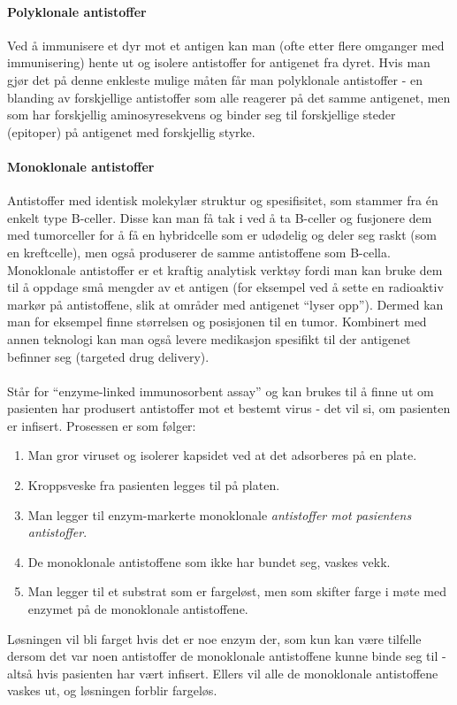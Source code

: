 \paragraph{Polyklonale antistoffer} Ved å immunisere et dyr mot et antigen kan man (ofte etter flere omganger med immunisering) hente ut og isolere antistoffer for antigenet fra dyret. Hvis man gjør det på denne enkleste mulige måten får man polyklonale antistoffer - en blanding av forskjellige antistoffer som alle reagerer på det samme antigenet, men som har forskjellig aminosyresekvens og binder seg til forskjellige steder (epitoper) på antigenet med forskjellig styrke.

\paragraph{Monoklonale antistoffer} Antistoffer med identisk molekylær struktur og spesifisitet, som stammer fra én enkelt type B-celler. Disse kan man få tak i ved å ta B-celler og fusjonere dem med tumorceller for å få en hybridcelle som er udødelig og deler seg raskt (som en kreftcelle), men også produserer de samme antistoffene som B-cella. Monoklonale antistoffer er et kraftig analytisk verktøy fordi man kan bruke dem til å oppdage små mengder av et antigen (for eksempel ved å sette en radioaktiv markør på antistoffene, slik at områder med antigenet ``lyser opp''). Dermed kan man for eksempel finne størrelsen og posisjonen til en tumor. Kombinert med annen teknologi kan man også levere medikasjon spesifikt til der antigenet befinner seg (targeted drug delivery).

\paragraph{} Står for ``enzyme-linked immunosorbent assay'' og kan brukes til å finne ut om pasienten har produsert antistoffer mot et bestemt virus - det vil si, om pasienten er infisert. Prosessen er som følger:
\begin{enumerate}
	\item Man gror viruset og isolerer kapsidet ved at det adsorberes på en plate.
	\item Kroppsveske fra pasienten legges til på platen.
	\item Man legger til enzym-markerte monoklonale \emph{antistoffer mot pasientens antistoffer}.
	\item De monoklonale antistoffene som ikke har bundet seg, vaskes vekk. 
	\item Man legger til et substrat som er fargeløst, men som skifter farge i møte med enzymet på de monoklonale antistoffene.
\end{enumerate}
Løsningen vil bli farget hvis det er noe enzym der, som kun kan være tilfelle dersom det var noen antistoffer de monoklonale antistoffene kunne binde seg til - altså hvis pasienten har vært infisert. Ellers vil alle de monoklonale antistoffene vaskes ut, og løsningen forblir fargeløs.

